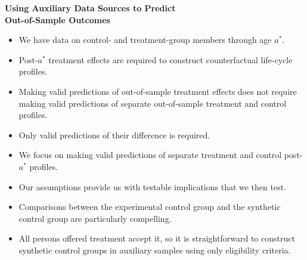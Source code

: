 \documentclass[static]{JJH-Beamer}
\begin{document}
\begin{frame}

\begin{center}
\textbf{Using Auxiliary Data Sources to Predict\\ Out-of-Sample Outcomes}
\end{center}

\end{frame}

\begin{frame}

\begin{itemize}
\item We have data on control- and treatment-group members through age $a^{\ast}$.
\item Post-$a^{\ast}$ treatment effects are required to construct counterfactual life-cycle profiles.
\item Making valid predictions of out-of-sample treatment effects does not require making valid predictions of separate out-of-sample treatment and control profiles.
\item Only valid predictions of their difference is required.
\end{itemize}

\end{frame}

\begin{frame}

\begin{itemize}
\item We focus on making valid predictions of separate treatment and control post-$a^*$ profiles.
\item Our assumptions provide us with testable implications that we then test.
\item Comparisons between the experimental control group and the synthetic control group are particularly compelling.
\item All persons offered treatment accept it, so it is straightforward to construct synthetic control groups in auxiliary samples using only eligibility criteria.
\end{itemize}

\end{frame}
\end{document}

